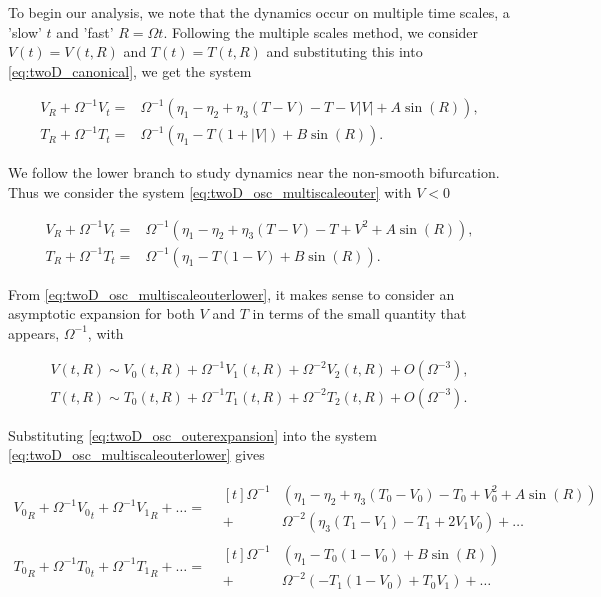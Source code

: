 To begin our analysis, we note that the dynamics occur on multiple time scales, a 'slow' $t$ and 'fast' $R = \Omega t$. Following the multiple scales method, we consider $V(t)=V(t,R)$ and $T(t)=T(t,R)$ and substituting this into \eqref{eq:twoD_canonical}, we get the system

\begin{equation}\label{eq:twoD_osc_multiscaleouter}
\begin{aligned}
V_R+\Omega^{-1}V_t = & \Omega^{-1}\left(\eta_1-\eta_2+\eta_3(T-V)-T-V|V|+A\sin(R)\right),\\
T_R+\Omega^{-1}T_t = & \Omega^{-1}\left(\eta_1-T(1+|V|)+B\sin(R)\right).
\end{aligned}
\end{equation}

We follow the lower branch to study dynamics near the non-smooth bifurcation. Thus we consider the system \eqref{eq:twoD_osc_multiscaleouter} with $V<0$

\begin{equation}\label{eq:twoD_osc_multiscaleouterlower}
\begin{aligned}
V_R+\Omega^{-1}V_t = & \Omega^{-1}\left(\eta_1-\eta_2+\eta_3(T-V)-T+V^2+A\sin(R)\right),\\
T_R+\Omega^{-1}T_t = & \Omega^{-1}\left(\eta_1-T(1-V)+B\sin(R)\right).
\end{aligned}
\end{equation}

From \eqref{eq:twoD_osc_multiscaleouterlower}, it makes sense to consider an asymptotic expansion for both $V$ and $T$ in terms of the small quantity that appears, $\Omega^{-1}$, with

\begin{equation}\label{eq:twoD_osc_outerexpansion}
\begin{aligned}
V(t,R)\sim V_0(t,R) +\Omega^{-1}V_1(t,R) +\Omega^{-2}V_2(t,R)+O(\Omega^{-3}),\\
T(t,R)\sim T_0(t,R) +\Omega^{-1}T_1(t,R) +\Omega^{-2}T_2(t,R)+O(\Omega^{-3}).
\end{aligned}
\end{equation}

Substituting \eqref{eq:twoD_osc_outerexpansion} into the system \eqref{eq:twoD_osc_multiscaleouterlower} gives

\begin{equation*}
\begin{aligned}
{V_0}_R+\Omega^{-1}{V_0}_t+\Omega^{-1}{V_1}_R+\ldots=&\begin{aligned}[t]\Omega^{-1}&(\eta_1-\eta_2+\eta_3(T_0-V_0)-T_0+V_0^2+A\sin(R))\\
+&\Omega^{-2}(\eta_3(T_1-V_1)-T_1+2V_1V_0)+\ldots
\end{aligned}\\
{T_0}_R+\Omega^{-1}{T_0}_t+\Omega^{-1}{T_1}_R+\ldots=&\begin{aligned}[t] \Omega^{-1}&(\eta_1-T_0(1-V_0)+B\sin(R))\\
+&\Omega^{-2}(-T_1(1-V_0)+T_0V_1)+\ldots
\end{aligned}
\end{aligned}
\end{equation*}

